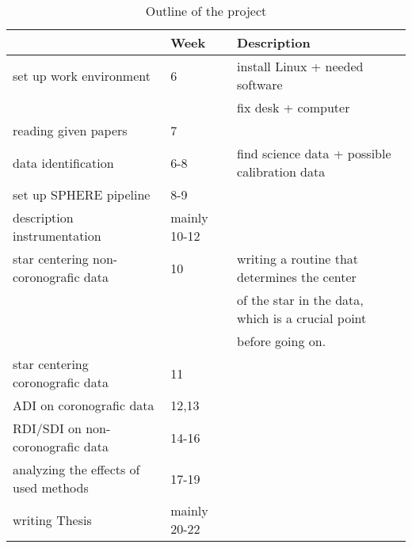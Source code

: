 \documentclass[11pt]{article}
\numberwithin{figure}{section}
\begin{document}
\begin{table}[ht]
\centering
\caption{Outline of the project}
\begin{tabular}{l|l|l|}
								& \bf{Week}		& \bf{Description}	\\\hline
set up work environment			& 6				& install Linux + needed software  \\
								&				& fix desk + computer 				\\
reading given papers			& 7				& \\
data identification				& 6-8			& find science data + possible calibration data\\
set up SPHERE pipeline			& 8-9			&\\
description instrumentation		& mainly 10-12	&\\
star centering non-coronografic data	& 10	& writing a routine that determines the center \\
&&of the star in the data, which is a crucial point\\
&& before going on.\\
star centering coronografic data & 11			& \\
ADI on coronografic data & 12,13		& \\
RDI/SDI on non-coronografic data & 14-16 & \\
analyzing the effects of used methods& 17-19 & \\
writing Thesis					& mainly 20-22	&\\
\end{tabular}
\end{table}
\end{document}
